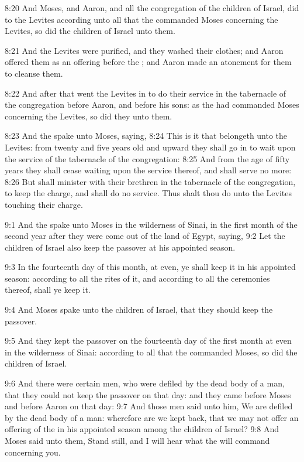8:20 And Moses, and Aaron, and all the congregation of the children of
Israel, did to the Levites according unto all that the \LORD commanded
Moses concerning the Levites, so did the children of Israel unto them.

8:21 And the Levites were purified, and they washed their clothes; and
Aaron offered them as an offering before the \LORD; and Aaron made an
atonement for them to cleanse them.

8:22 And after that went the Levites in to do their service in the
tabernacle of the congregation before Aaron, and before his sons: as
the \LORD had commanded Moses concerning the Levites, so did they unto
them.

8:23 And the \LORD spake unto Moses, saying, 8:24 This is it that
belongeth unto the Levites: from twenty and five years old and upward
they shall go in to wait upon the service of the tabernacle of the
congregation: 8:25 And from the age of fifty years they shall cease
waiting upon the service thereof, and shall serve no more: 8:26 But
shall minister with their brethren in the tabernacle of the
congregation, to keep the charge, and shall do no service. Thus shalt
thou do unto the Levites touching their charge.

9:1 And the \LORD spake unto Moses in the wilderness of Sinai, in the
first month of the second year after they were come out of the land of
Egypt, saying, 9:2 Let the children of Israel also keep the passover
at his appointed season.

9:3 In the fourteenth day of this month, at even, ye shall keep it in
his appointed season: according to all the rites of it, and according
to all the ceremonies thereof, shall ye keep it.

9:4 And Moses spake unto the children of Israel, that they should keep
the passover.

9:5 And they kept the passover on the fourteenth day of the first
month at even in the wilderness of Sinai: according to all that the
\LORD commanded Moses, so did the children of Israel.

9:6 And there were certain men, who were defiled by the dead body of a
man, that they could not keep the passover on that day: and they came
before Moses and before Aaron on that day: 9:7 And those men said unto
him, We are defiled by the dead body of a man: wherefore are we kept
back, that we may not offer an offering of the \LORD in his appointed
season among the children of Israel?  9:8 And Moses said unto them,
Stand still, and I will hear what the \LORD will command concerning
you.

